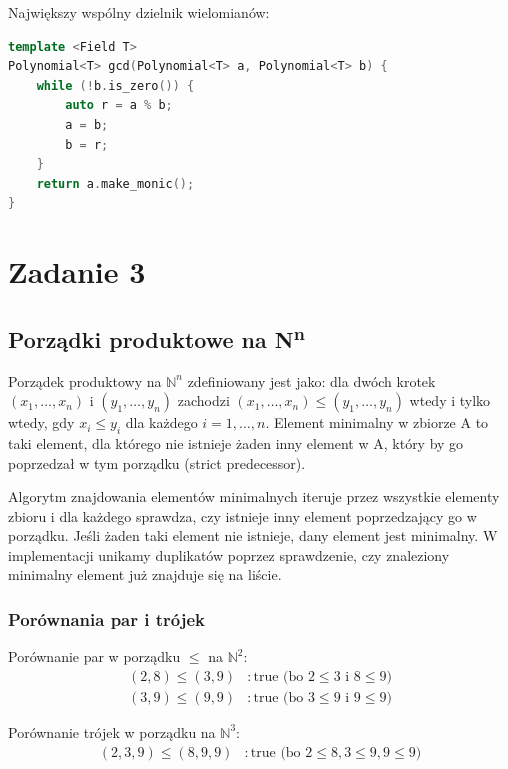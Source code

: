 \documentclass{article}
\begin{document}
Największy wspólny dzielnik wielomianów:

\begin{lstlisting}[language=C++]
template <Field T>
Polynomial<T> gcd(Polynomial<T> a, Polynomial<T> b) {
    while (!b.is_zero()) {
        auto r = a % b;
        a = b;
        b = r;
    }
    return a.make_monic();
}
\end{lstlisting}

\clearpage

\section*{Zadanie 3}

\subsection*{Porządki produktowe na N\textsuperscript{n}}

Porządek produktowy na \(\mathbb{N}^n\) zdefiniowany jest jako: dla dwóch krotek \((x_1, \ldots, x_n)\) i \((y_1, \ldots, y_n)\) zachodzi \((x_1, \ldots, x_n) \leq (y_1, \ldots, y_n)\) wtedy i tylko wtedy, gdy \(x_i \leq y_i\) dla każdego \(i = 1, \ldots, n\). Element minimalny w zbiorze A to taki element, dla którego nie istnieje żaden inny element w A, który by go poprzedzał w tym porządku (strict predecessor).

Algorytm znajdowania elementów minimalnych iteruje przez wszystkie elementy zbioru i dla każdego sprawdza, czy istnieje inny element poprzedzający go w porządku. Jeśli żaden taki element nie istnieje, dany element jest minimalny. W implementacji unikamy duplikatów poprzez sprawdzenie, czy znaleziony minimalny element już znajduje się na liście.

\subsubsection*{Porównania par i trójek}

Porównanie par w porządku \(\leq\) na \(\mathbb{N}^2\):
\begin{align*}
(2, 8) \leq (3, 9) &: \text{true (bo } 2 \leq 3 \text{ i } 8 \leq 9\text{)} \\
(3, 9) \leq (9, 9) &: \text{true (bo } 3 \leq 9 \text{ i } 9 \leq 9\text{)}
\end{align*}

Porównanie trójek w porządku na \(\mathbb{N}^3\):
\begin{align*}
(2, 3, 9) \leq (8, 9, 9) &: \text{true (bo } 2 \leq 8, 3 \leq 9, 9 \leq 9\text{)}
\end{align*}
\end{document}
